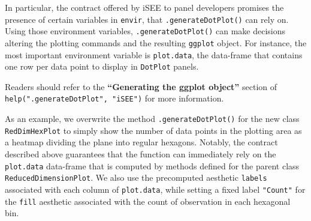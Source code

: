 \documentclass[
]{book}
\begin{document}
In particular, the contract offered by iSEE to panel developers promises the presence of certain variables in \texttt{envir}, that \texttt{.generateDotPlot()} can rely on.
Using those environment variables, \texttt{.generateDotPlot()} can make decisions altering the plotting commands and the resulting \texttt{ggplot} object.
For instance, the most important environment variable is \texttt{plot.data}, the data-frame that contains one row per data point to display in \texttt{DotPlot} panels.

Readers should refer to the \textbf{``Generating the ggplot object''} section of \texttt{help(".generateDotPlot",\ "iSEE")} for more information.

As an example, we overwrite the method \texttt{.generateDotPlot()} for the new class \texttt{RedDimHexPlot} to simply show the number of data points in the plotting area as a heatmap dividing the plane into regular hexagons.
Notably, the contract described above guarantees that the function can immediately rely on the \texttt{plot.data} data-frame that is computed by methods defined for the parent class \texttt{ReducedDimensionPlot}.
We also use the precomputed aesthetic \texttt{labels} associated with each column of \texttt{plot.data}, while setting a fixed label \texttt{"Count"} for the \texttt{fill} aesthetic associated with the count of observation in each hexagonal bin.
\end{document}
